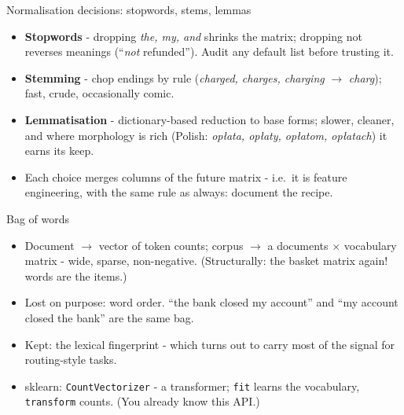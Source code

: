 \documentclass[10pt,aspectratio=169]{beamer}
\begin{document}
\begin{frame}{Normalisation decisions: stopwords, stems, lemmas}
  \begin{itemize}
    \item \textbf{Stopwords} - dropping \emph{the, my, and} shrinks the
          matrix; dropping \alert{not} reverses meanings
          (``\emph{not} refunded''). Audit any default list before
          trusting it.
    \item \textbf{Stemming} - chop endings by rule
          (\emph{charged, charges, charging} $\to$ \emph{charg});
          fast, crude, occasionally comic.
    \item \textbf{Lemmatisation} - dictionary-based reduction to base
          forms; slower, cleaner, and where morphology is rich
          (Polish: \emph{opłata, opłaty, opłatom, opłatach}) it earns its
          keep.
    \item Each choice merges columns of the future matrix - i.e.\ it is
          \alert{feature engineering}, with the same rule as always:
          document the recipe.
  \end{itemize}
\end{frame}

\begin{frame}{Bag of words}
  \begin{itemize}
    \item Document $\to$ vector of token counts; corpus $\to$ a
          \alert{documents $\times$ vocabulary} matrix - wide, sparse,
          non-negative. (Structurally: the basket matrix again! words are
          the items.)
    \item Lost on purpose: word order. ``the bank closed my account'' and
          ``my account closed the bank'' are the same bag.
    \item Kept: the lexical fingerprint - which turns out to carry most
          of the signal for routing-style tasks.
    \item sklearn: \texttt{CountVectorizer} - a transformer;
          \texttt{fit} learns the vocabulary, \texttt{transform} counts.
          (You already know this API.)
  \end{itemize}
\end{frame}
\end{document}
